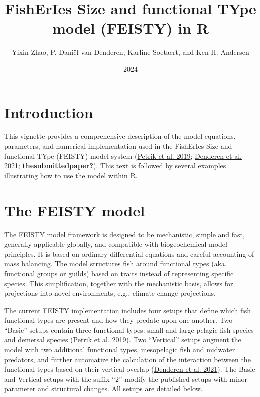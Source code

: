 \documentclass[
]{article}
\title{FishErIes Size and functional TYpe model (FEISTY) in R}
\author{Yixin Zhao, P. Daniël van Denderen, Karline Soetaert, and Ken H.
Andersen}
\date{2024}
\begin{document}
\maketitle

\hypertarget{introduction}{%
\section{Introduction}\label{introduction}}

This vignette provides a comprehensive description of the model
equations, parameters, and numerical implementation used in the
FishErIes Size and functional TYpe (FEISTY) model system
(\protect\hyperlink{ref-petrik2019bottom}{Petrik et al. 2019};
\protect\hyperlink{ref-van2021emergent}{Denderen et al. 2021};
\protect\hyperlink{ref-thesubmittedpaper}{\textbf{thesubmittedpaper?}}).
This text is followed by several examples illustrating how to use the
model within R.

\hypertarget{the-feisty-model}{%
\section{The FEISTY model}\label{the-feisty-model}}

The FEISTY model framework is designed to be mechanistic, simple and
fast, generally applicable globally, and compatible with biogeochemical
model principles. It is based on ordinary differential equations and
careful accounting of mass balancing. The model structures fish around
functional types (aka. functional groups or guilds) based on traits
instead of representing specific species. This simplification, together
with the mechanistic basis, allows for projections into novel
environments, e.g., climate change projections.

The current FEISTY implementation includes four setups that define which
fish functional types are present and how they predate upon one another.
Two ``Basic'' setups contain three functional types: small and large
pelagic fish species and demersal species
(\protect\hyperlink{ref-petrik2019bottom}{Petrik et al. 2019}). Two
``Vertical'' setups augment the model with two additional functional
types, mesopelagic fish and midwater predators, and further automatize
the calculation of the interaction between the functional types based on
their vertical overlap (\protect\hyperlink{ref-van2021emergent}{Denderen
et al. 2021}). The Basic and Vertical setups with the suffix ``2''
modify the published setups with minor parameter and structural changes.
All setups are detailed below.
\end{document}
